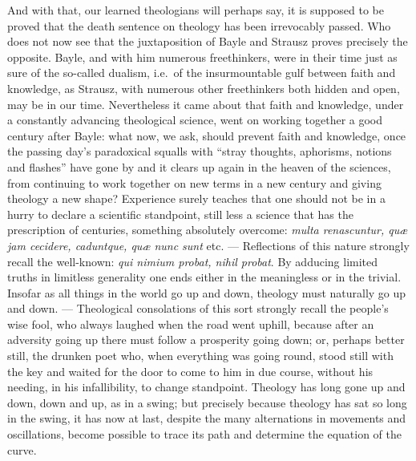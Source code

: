 \documentclass[12pt]{book}
\newcommand{\opage}[1]{\marginnote{\footnotesize\textit{[#1]}}}
\begin{document}
And with that, our learned theologians will perhaps say, it is supposed to be
proved that the death sentence on theology has been irrevocably passed. Who
does not now see that the juxtaposition of Bayle and Strausz proves precisely
the opposite. Bayle, and with him numerous freethinkers, were in their time
just as sure of the so-called dualism, i.e.\ of the insurmountable gulf between
faith and knowledge, as Strausz, with numerous other freethinkers both hidden
and open, may be in our time. Nevertheless it came about that faith and
knowledge, under a constantly advancing theological science, went on working
together a good century after Bayle: what now, we ask, should
\opage{272}\setcounter{footnote}{0}%
prevent faith and knowledge, once the passing day's paradoxical squalls with
``stray thoughts, aphorisms, notions and flashes'' have gone by and it clears
up again in the heaven of the sciences, from continuing to work together on
new terms in a new century and giving theology a new shape? Experience surely
teaches that one should not be in a hurry to declare a scientific standpoint,
still less a science that has the prescription of centuries, something
absolutely overcome: \textit{multa renascuntur, quæ jam cecidere, caduntque,
quæ nunc sunt} etc. --- Reflections of this nature strongly recall the
well-known: \textit{qui nimium probat, nihil probat}. By adducing limited
truths in limitless generality one ends either in the meaningless or in the
trivial. Insofar as all things in the world go up and down, theology must
naturally go up and down. --- Theological consolations of this sort strongly
recall the people's wise fool, who always laughed when the road went uphill,
because after an adversity going up there must follow a prosperity going down;
or, perhaps better still, the drunken poet who, when everything was going
round, stood still with the key and waited for the door to come to him in
due course, without his needing, in his infallibility, to change standpoint.
Theology has long gone up and down, down and up, as in a swing; but precisely
because theology has sat so long in the swing, it has now at last, despite the
many alternations in movements and oscillations, become possible to trace its
path and determine the equation of the curve.
\end{document}
